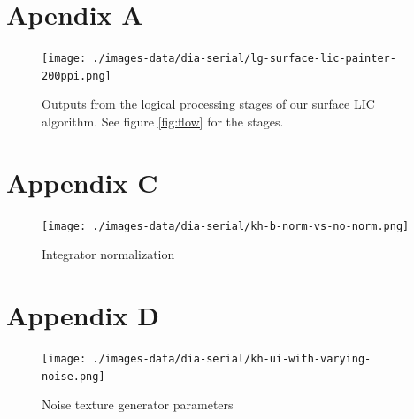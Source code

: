 \documentclass[a4paper,10pt]{article}
\begin{document}
\FloatBarrier

\section{Apendix A}
\label{sec:pslic-outputs}
\begin{figure}[h]
	\centering
	\texttt{[image: ./images-data/dia-serial/lg-surface-lic-painter-200ppi.png]}
	\label{fig:lic2d-outputs}
  \caption{Outputs from the logical processing stages of our surface LIC algorithm. See figure \ref{fig:flow} for the stages.}
\end{figure}
\FloatBarrier

% 




\section{Appendix C}
\begin{figure}[h]
 \centering
 \texttt{[image: ./images-data/dia-serial/kh-b-norm-vs-no-norm.png]}
 \caption{Integrator normalization}
 \label{fig:vec-norm-2}
\end{figure}

\section{Appendix D}
\begin{figure}[h]
 \centering
 \texttt{[image: ./images-data/dia-serial/kh-ui-with-varying-noise.png]}
 \caption{Noise texture generator parameters}
 \label{fig:noise-params}
\end{figure}
\end{document}
